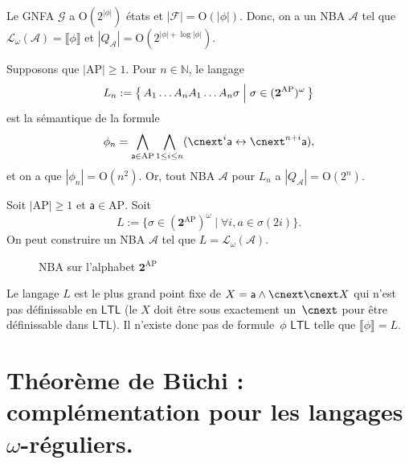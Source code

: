 \documentclass[./main]{subfiles}
\begin{document}
  \begin{rmk}
    Le GNFA $\mathcal{G}$ a $\mathrm{O}(2^{|\phi|})$ états et $|\mathcal{F}| = \mathrm{O}(|\phi|)$.
    Donc, on a un NBA $\mathcal{A}$ tel que $\mathcal{L}_\omega(\mathcal{A}) = \llbracket \phi\rrbracket$ et $|Q_{\mathcal{A}}| = \mathrm{O}(2^{|\phi| + \log|\phi|})$.
  \end{rmk}

  \begin{rmk}
    Supposons que $|\mathrm{AP}| \ge 1$.
    Pour $n \in \mathds{N}$, le langage 
    \[
    L_n := \mleft\{\,A_1 \ldots A_n A_1 \ldots A_n \sigma \;\middle|\; \sigma \in (\mathbf{2}^\mathrm{AP})^\omega \,\mright\} 
    \] est la sémantique de la formule 
    \[
    \phi_n = \bigwedge_{\mathsf{a} \in \mathrm{AP}}
    \bigwedge_{1 \le i \le n} (\nxt^i \mathsf{a} \leftrightarrow \nxt^{n+i} \mathsf{a})
    ,\] et on a que $|\phi_n| = \mathrm{O}(n^2)$.
    Or, tout NBA $\mathcal{A}$ pour $L_n$ a ${|Q_{\mathcal{A}}| = \mathrm{O}(2^n)}$.
  \end{rmk}

  \begin{rmk}
    Soit $|\mathrm{AP}| \ge 1$ et $\mathsf{a} \in \mathrm{AP}$.
    Soit  \[
    L := \{\sigma \in (\mathbf{2}^\mathrm{AP})^\omega  \mid \forall i , a \in \sigma(2i)\} 
    .\] 
    On peut construire un NBA $\mathcal{A}$ tel que $L = \mathcal{L}_\omega(\mathcal{A})$.

    \begin{figure}[H]
      \centering
      \caption{NBA sur l'alphabet $\mathbf{2}^\mathrm{AP}$}
    \end{figure}

    Le langage $L$ est le plus grand point fixe de $X = \mathsf{a} \land \nxt\nxt X$ qui n'est pas définissable en $\mathsf{LTL}$ (le $X$ doit être sous exactement un~$\nxt$ pour être définissable dans  $\mathsf{LTL}$).
    Il n'existe donc pas de formule~$\phi$ $\mathsf{LTL}$ telle que $\llbracket \phi\rrbracket = L$.
  \end{rmk}

  \section{Théorème de Büchi : complémentation pour les langages $\omega$-réguliers.}
\end{document}
